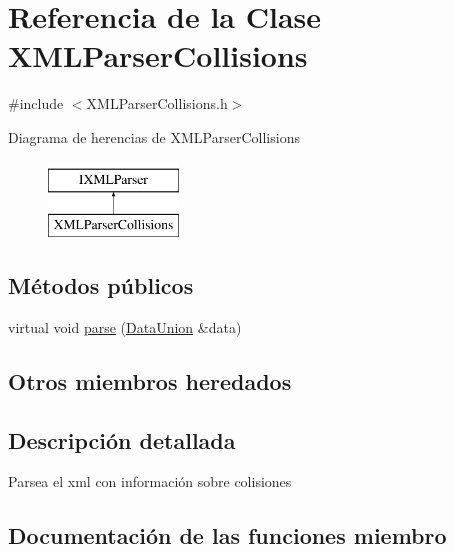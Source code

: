 \hypertarget{classXMLParserCollisions}{}\section{Referencia de la Clase X\+M\+L\+Parser\+Collisions}
\label{classXMLParserCollisions}


{\ttfamily \#include $<$X\+M\+L\+Parser\+Collisions.\+h$>$}

Diagrama de herencias de X\+M\+L\+Parser\+Collisions\begin{figure}[H]
\begin{center}
\leavevmode
\includegraphics[height=2.000000cm]{classXMLParserCollisions}
\end{center}
\end{figure}
\subsection*{Métodos públicos}
\begin{DoxyCompactItemize}
\item 
virtual void \hyperlink{classXMLParserCollisions_ae22d366d5d11adba7e89f3a183160988}{parse} (\hyperlink{unionDataUnion}{Data\+Union} \&data)
\end{DoxyCompactItemize}
\subsection*{Otros miembros heredados}


\subsection{Descripción detallada}
Parsea el xml con información sobre colisiones 

\subsection{Documentación de las funciones miembro}
\hypertarget{classXMLParserCollisions_ae22d366d5d11adba7e89f3a183160988}{}
